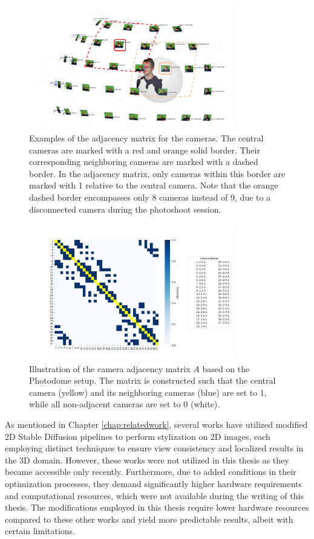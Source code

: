 \begin{figure}[H]
	\centering
	\includegraphics[width=0.8\textwidth]{Figures/methods/camera_batch.png}
	\caption{Examples of the adjacency matrix for the cameras. The central cameras are marked with a red and orange solid border. Their corresponding neighboring cameras are marked with a dashed border. In the adjacency matrix, only cameras within this border are marked with 1 relative to the central camera. Note that the orange dashed border encompasses only 8 cameras instead of 9, due to a disconnected camera during the photoshoot session.}
	\label{fig:camera_batch}
\end{figure}


\begin{figure}[H]
	\centering
	\includegraphics[width=0.8\textwidth]{Figures/methods/adj_matrix.png}
	\caption{Illustration of the camera adjacency matrix $A$ based on the Photodome setup. The matrix is constructed such that the central camera (yellow) and its neighboring cameras (blue) are set to 1, while all non-adjacent cameras are set to 0 (white).}
	\label{fig:adj_matrix}
\end{figure}

As mentioned in Chapter \ref{chap:relatedwork}, several works have utilized modified 2D Stable Diffusion pipelines to perform stylization on 2D images, each employing distinct techniques to ensure view consistency and localized results in the 3D domain. However, these works were not utilized in this thesis as they became accessible only recently. Furthermore, due to added conditions in their optimization processes, they demand significantly higher hardware requirements and computational resources, which were not available during the writing of this thesis. The modifications employed in this thesis require lower hardware resources compared to these other works and yield more predictable results, albeit with certain limitations.

